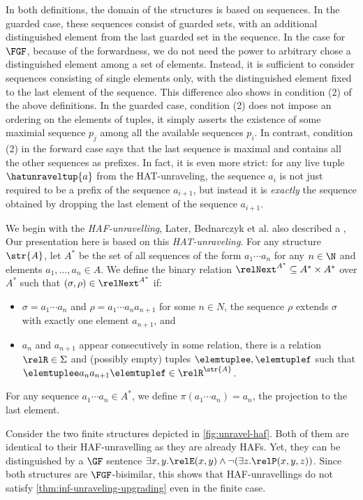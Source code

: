 In both definitions, the domain of the structures is based on sequences.
In the guarded case, these sequences consist of guarded sets, with an additional distinguished element from the last guarded set in the sequence.
In the case for $\FGF$, because of the forwardness, we do not need the power to arbitrary chose a distinguished element among a set of elements.
Instead, it is sufficient to consider sequences consisting of single elements only, with the distinguished element fixed to the last element of the sequence.
This difference also shows in condition (2) of the above definitions.
In the guarded case, condition (2) does not impose an ordering on the elements of tuples, it simply asserts the existence of some maximial sequence $p_{j}$ among all the available sequences $p_{i}$.
In contrast, condition (2) in the forward case says that the last sequence is maximal and contains all the other sequences as prefixes.
In fact, it is even more strict: for any live tuple $\hatunraveltup{a}$ from the HAT-unraveling, the sequence $a_{i}$ is not just required to be a prefix of the sequence $a_{i+1}$, but instead it is \emph{exactly} the sequence obtained by dropping the last element of the sequence $a_{i+1}$.




We begin with the \emph{HAF-unravelling},
Later, Bednarczyk et al. also described a ,
Our presentation here is based on this \emph{HAT-unraveling}.
For any structure $\str{A}$, let $A^{*}$ be the set of all sequences of the form $a_{1}\cdots{}a_{n}$ for any $n \in \N$ and elements $a_{1}, \ldots, a_{n} \in A$.
We define the binary relation $\relNext^{A^{*}} \subseteq A^{*} \times A^{*}$ over $A^{*}$ such that $(\sigma, \rho) \in \relNext^{A^{*}}$ if:
\begin{itemize}
  \item $\sigma = a_{1}\cdots{}a_{n}$ and $\rho = a_{1}\cdots{}a_{n} a_{n+1}$ for some $n \in N$, \ie{} the sequence $\rho$ extends $\sigma$ with exactly one element $a_{n+1}$, and
  \item $a_{n}$ and $a_{n+1}$ appear consecutively in some relation, \ie{} there is a relation $\relR \in \Sigma$ and (possibly empty) tuples $\elemtuplee, \elemtuplef$ such that $\elemtuplee a_{n} a_{n+1} \elemtuplef \in \relR^{\str{A}}$.
\end{itemize}
For any sequence $a_{1}\cdots{}a_{n} \in A^{*}$, we define $\pi(a_{1}\cdots{}a_{n}) = a_{n}$, the projection to the last element.

Consider the two finite structures depicted in \cref{fig:unravel-haf}.
Both of them are identical to their HAF-unravelling as they are already HAFs.
Yet, they can be distinguished by a $\GF$ sentence $\exists{x,y}. \relE(x,y) \land \lnot (\exists z. \relP(x,y,z))$.
Since both structures are $\FGF$-bisimilar, this shows that HAF-unravellings do not satisfy \cref{thm:inf-unraveling-upgrading} even in the finite case.

